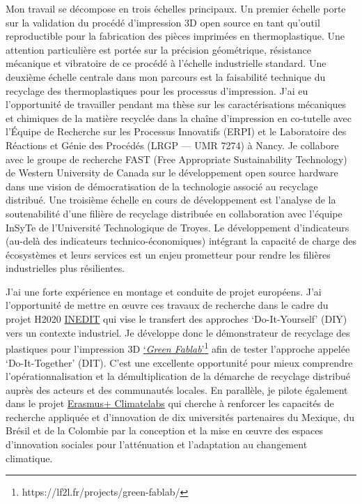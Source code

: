 \documentclass[
  11pt,
]{article}
\begin{document}
Mon travail se décompose en trois échelles principaux. Un premier
échelle porte sur la validation du procédé d'impression 3D open source
en tant qu'outil reproductible pour la fabrication des pièces imprimées
en thermoplastique. Une attention particulière est portée sur la
précision géométrique, résistance mécanique et vibratoire de ce procédé
à l'échelle industrielle standard. Une deuxième échelle centrale dans
mon parcours est la faisabilité technique du recyclage des
thermoplastiques pour les processus d'impression. J'ai eu l'opportunité
de travailler pendant ma thèse sur les caractérisations mécaniques et
chimiques de la matière recyclée dans la chaîne d'impression en
co-tutelle avec l'Équipe de Recherche sur les Processus Innovatifs
(ERPI) et le Laboratoire des Réactions et Génie des Procédés (LRGP ---
UMR 7274) à Nancy. Je collabore avec le groupe de recherche FAST (Free
Appropriate Sustainability Technology) de Western University de Canada
sur le développement open source hardware dans une vision de
démocratisation de la technologie associé au recyclage distribué. Une
troisième échelle en cours de développement est l'analyse de la
soutenabilité d'une filière de recyclage distribuée en collaboration
avec l'équipe InSyTe de l'Université Technologique de Troyes. Le
développement d'indicateurs (au-delà des indicateurs
technico-économiques) intégrant la capacité de charge des écosystèmes et
leurs services est un enjeu prometteur pour rendre les filières
industrielles plus résilientes.

J'ai une forte expérience en montage et conduite de projet européens.
J'ai l'opportunité de mettre en œuvre ces travaux de recherche dans le
cadre du projet H2020
\href{http://erpi.univ-lorraine.fr/projects/INEDIT/}{INEDIT} qui vise le
transfert des approches `Do-It-Yourself' (DIY) vers un contexte
industriel. Je développe donc le démonstrateur de recyclage des
plastiques pour l'impression 3D
\href{https://lf2l.fr/projects/green-fablab/}{`\emph{Green
Fablab}'}\footnote{https://lf2l.fr/projects/green-fablab/} afin de
tester l'approche appelée `Do-It-Together' (DIT). C'est une excellente
opportunité pour mieux comprendre l'opérationnalisation et la
démultiplication de la démarche de recyclage distribué auprès des
acteurs et des communautés locales. En parallèle, je pilote également
dans le projet
\href{https://erpi.univ-lorraine.fr/fr/projects/Climatelabs/}{Erasmus+
Climatelabs} qui cherche à renforcer les capacités de recherche
appliquée et d'innovation de dix universités partenaires du Mexique, du
Brésil et de la Colombie par la conception et la mise en œuvre des
espaces d'innovation sociales pour l'atténuation et l'adaptation au
changement climatique.
\end{document}
